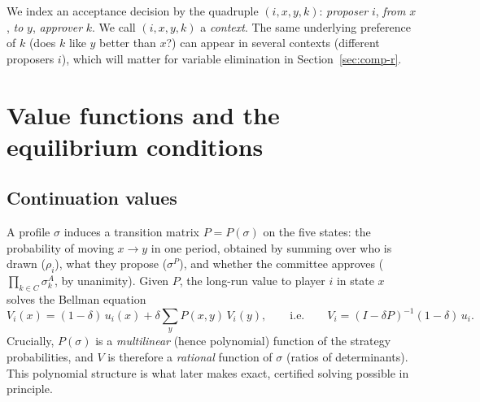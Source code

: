 \documentclass[11pt]{article}
\begin{document}
We index an acceptance decision by the quadruple $(i,x,y,k)$: \emph{proposer} $i$,
\emph{from} $x$, \emph{to} $y$, \emph{approver} $k$. We call $(i,x,y,k)$ a
\emph{context}. The same underlying preference of $k$ (does $k$ like $y$ better than
$x$?) can appear in several contexts (different proposers $i$), which will matter for
variable elimination in Section~\ref{sec:comp-r}.

\section{Value functions and the equilibrium conditions}
\label{sec:mpe}

\subsection{Continuation values}
A profile $\sigma$ induces a transition matrix $P=P(\sigma)$ on the five states: the
probability of moving $x\to y$ in one period, obtained by summing over who is drawn
($\rho_i$), what they propose ($\sigma^P$), and whether the committee approves
($\prod_{k\in C}\sigma^A_k$, by unanimity). Given $P$, the long-run value to player
$i$ in state $x$ solves the Bellman equation
\begin{equation}
\label{eq:bellman}
V_i(x) = (1-\delta)\,u_i(x) + \delta \sum_{y} P(x,y)\,V_i(y),
\qquad\text{i.e.}\qquad
V_i = (I-\delta P)^{-1}(1-\delta)\,u_i .
\end{equation}
Crucially, $P(\sigma)$ is a \emph{multilinear} (hence polynomial) function of the
strategy probabilities, and $V$ is therefore a \emph{rational} function of $\sigma$
(ratios of determinants). This polynomial structure is what later makes exact,
certified solving possible in principle.
\end{document}
